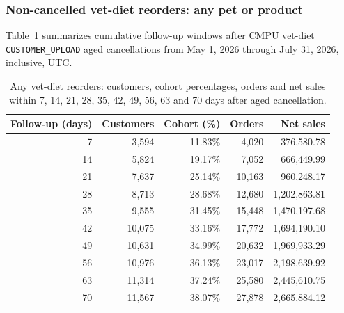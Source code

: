 \clearpage
\subsubsection{Non-cancelled vet-diet reorders: any pet or product}
Table~\ref{tab:financial-opportunity-reorder-any-vet-diet} summarizes cumulative
follow-up windows after CMPU vet-diet \texttt{CUSTOMER\_UPLOAD} aged cancellations
from May 1, 2026 through July 31, 2026, inclusive, UTC.

\begin{table}[!htbp]
\centering
\caption{Any vet-diet reorders: customers, cohort percentages, orders and net sales within 7, 14, 21, 28, 35, 42, 49, 56, 63 and 70 days after aged cancellation.}
\label{tab:financial-opportunity-reorder-any-vet-diet}
\begin{tabular}{@{}rrrrr@{}}
\toprule
Follow-up (days) & Customers & Cohort (\%) & Orders & Net sales \\
\midrule
7 & 3,594 & 11.83\% & 4,020 & 376,580.78 \\
14 & 5,824 & 19.17\% & 7,052 & 666,449.99 \\
21 & 7,637 & 25.14\% & 10,163 & 960,248.17 \\
28 & 8,713 & 28.68\% & 12,680 & 1,202,863.81 \\
35 & 9,555 & 31.45\% & 15,448 & 1,470,197.68 \\
42 & 10,075 & 33.16\% & 17,772 & 1,694,190.10 \\
49 & 10,631 & 34.99\% & 20,632 & 1,969,933.29 \\
56 & 10,976 & 36.13\% & 23,017 & 2,198,639.92 \\
63 & 11,314 & 37.24\% & 25,580 & 2,445,610.75 \\
70 & 11,567 & 38.07\% & 27,878 & 2,665,884.12 \\
\bottomrule
\end{tabular}


\end{table}
